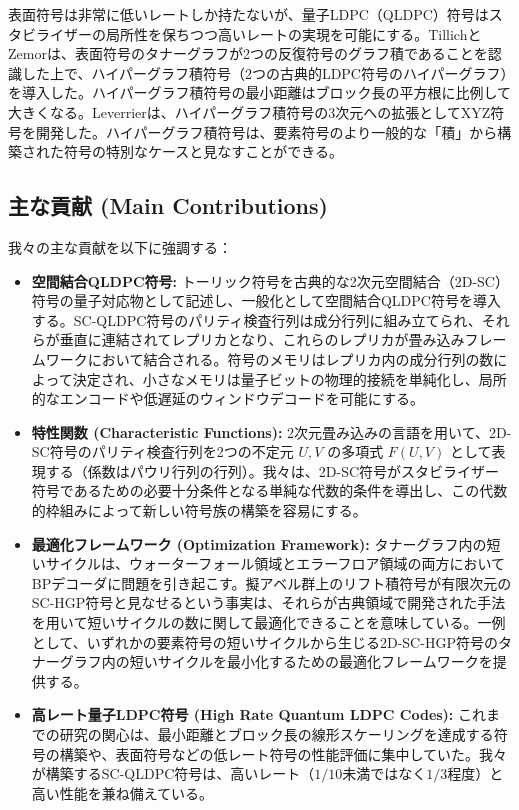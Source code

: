 \documentclass[a4paper,11pt]{article}
\begin{document}
表面符号は非常に低いレートしか持たないが、量子LDPC（QLDPC）符号はスタビライザーの局所性を保ちつつ高いレートの実現を可能にする。TillichとZemorは、表面符号のタナーグラフが2つの反復符号のグラフ積であることを認識した上で、ハイパーグラフ積符号（2つの古典的LDPC符号のハイパーグラフ）を導入した。ハイパーグラフ積符号の最小距離はブロック長の平方根に比例して大きくなる。Leverrierは、ハイパーグラフ積符号の3次元への拡張としてXYZ符号を開発した。ハイパーグラフ積符号は、要素符号のより一般的な「積」から構築された符号の特別なケースと見なすことができる。

\subsection*{主な貢献 (Main Contributions)}
我々の主な貢献を以下に強調する：

\begin{itemize}
    \item \textbf{空間結合QLDPC符号:} トーリック符号を古典的な2次元空間結合（2D-SC）符号の量子対応物として記述し、一般化として空間結合QLDPC符号を導入する。SC-QLDPC符号のパリティ検査行列は成分行列に組み立てられ、それらが垂直に連結されてレプリカとなり、これらのレプリカが畳み込みフレームワークにおいて結合される。符号のメモリはレプリカ内の成分行列の数によって決定され、小さなメモリは量子ビットの物理的接続を単純化し、局所的なエンコードや低遅延のウィンドウデコードを可能にする。
    
    \item \textbf{特性関数 (Characteristic Functions):} 2次元畳み込みの言語を用いて、2D-SC符号のパリティ検査行列を2つの不定元 $U, V$ の多項式 $F(U,V)$ として表現する（係数はパウリ行列の行列）。我々は、2D-SC符号がスタビライザー符号であるための必要十分条件となる単純な代数的条件を導出し、この代数的枠組みによって新しい符号族の構築を容易にする。
    
    \item \textbf{最適化フレームワーク (Optimization Framework):} タナーグラフ内の短いサイクルは、ウォーターフォール領域とエラーフロア領域の両方においてBPデコーダに問題を引き起こす。擬アベル群上のリフト積符号が有限次元のSC-HGP符号と見なせるという事実は、それらが古典領域で開発された手法を用いて短いサイクルの数に関して最適化できることを意味している。一例として、いずれかの要素符号の短いサイクルから生じる2D-SC-HGP符号のタナーグラフ内の短いサイクルを最小化するための最適化フレームワークを提供する。
    
    \item \textbf{高レート量子LDPC符号 (High Rate Quantum LDPC Codes):} これまでの研究の関心は、最小距離とブロック長の線形スケーリングを達成する符号の構築や、表面符号などの低レート符号の性能評価に集中していた。我々が構築するSC-QLDPC符号は、高いレート（$1/10$未満ではなく$1/3$程度）と高い性能を兼ね備えている。
\end{itemize}
\end{document}

